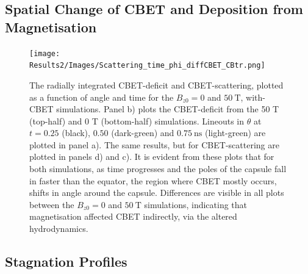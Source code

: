 \subsection{Spatial Change of CBET and Deposition from Magnetisation}%
\label{sec:Res2_mag_on_cbet_change}

\begin{figure}[t!]
    \texttt{[image: Results2/Images/Scattering\_time\_phi\_diffCBET\_CBtr.png]}
    \centering
    \caption{The radially integrated \ac{CBET}-deficit and \ac{CBET}-scattering, plotted as a function of angle and time for the $B_{z0}=0$ and $50\ \text{T}$, with-\ac{CBET} simulations.
    Panel b) plots the \ac{CBET}-deficit from the 50 T (top-half) and 0 T (bottom-half) simulations.
    Lineouts in $\theta$ at $t=0.25$ (black), $0.50$ (dark-green) and $0.75\ \text{ns}$ (light-green) are plotted in panel a).
    The same results, but for \ac{CBET}-scattering are plotted in panels d) and c).
    It is evident from these plots that for both simulations, as time progresses and the poles of the capsule fall in faster than the equator, the region where \ac{CBET} mostly occurs, shifts in angle around the capsule.
    Differences are visible in all plots between the $B_{z0}=0$ and $50\ \text{T}$ simulations, indicating that magnetisation affected \ac{CBET} indirectly, via the altered hydrodynamics.}%
    \label{fig:Res2_scattering}
\end{figure}

\subsection{Stagnation Profiles}%
\label{sec:Res2_stgnation_profiles}


